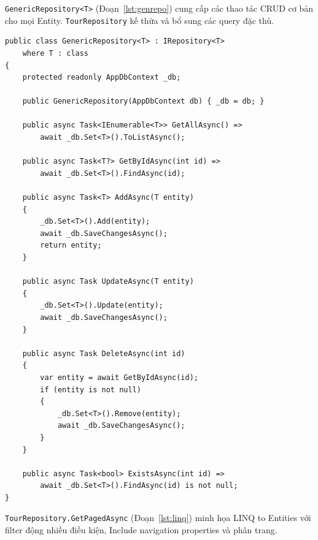 \texttt{GenericRepository<T>} (Đoạn~\ref{lst:genrepo}) cung
cấp các thao tác CRUD cơ bản cho mọi Entity.
\texttt{TourRepository} kế thừa và bổ sung các query đặc thù.

\begin{lstlisting}[style=csharp,
  caption={GenericRepository<T> -- CRUD cơ bản với EF Core},
  label={lst:genrepo}]
public class GenericRepository<T> : IRepository<T>
    where T : class
{
    protected readonly AppDbContext _db;

    public GenericRepository(AppDbContext db) { _db = db; }

    public async Task<IEnumerable<T>> GetAllAsync() =>
        await _db.Set<T>().ToListAsync();

    public async Task<T?> GetByIdAsync(int id) =>
        await _db.Set<T>().FindAsync(id);

    public async Task<T> AddAsync(T entity)
    {
        _db.Set<T>().Add(entity);
        await _db.SaveChangesAsync();
        return entity;
    }

    public async Task UpdateAsync(T entity)
    {
        _db.Set<T>().Update(entity);
        await _db.SaveChangesAsync();
    }

    public async Task DeleteAsync(int id)
    {
        var entity = await GetByIdAsync(id);
        if (entity is not null)
        {
            _db.Set<T>().Remove(entity);
            await _db.SaveChangesAsync();
        }
    }

    public async Task<bool> ExistsAsync(int id) =>
        await _db.Set<T>().FindAsync(id) is not null;
}
\end{lstlisting}

\texttt{TourRepository.GetPagedAsync} (Đoạn~\ref{lst:linq})
minh họa LINQ to Entities với filter động nhiều điều kiện,
Include navigation properties và phân trang.


